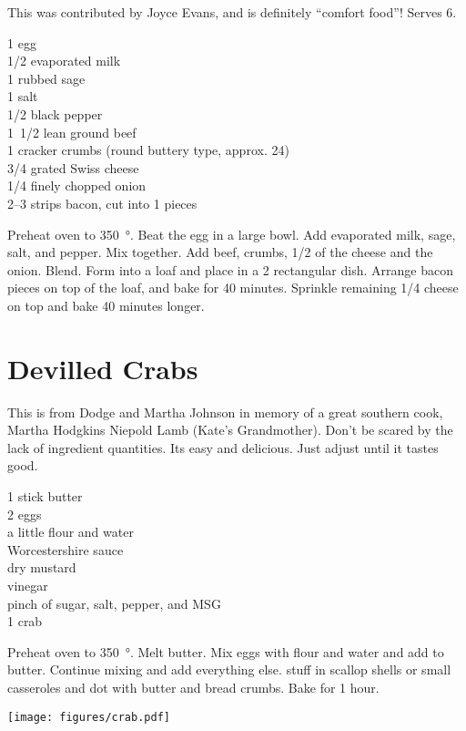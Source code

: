 \begin{open}
  This was contributed by Joyce Evans, and is definitely ``comfort
  food''! Serves 6.
\end{open}
\begin{ingredients}
  1 egg \\
  \SI{1/2}{\cup} evaporated milk \\
  \SI{1}{\teaspoon} rubbed sage \\
  \SI{1}{\teaspoon} salt \\
  \SI{1/2}{\teaspoon} black pepper \\
  \SI{1/2}[1]{\pound} lean ground beef \\
  \SI{1}{\cup} cracker crumbs (round buttery type, approx. 24) \\
  \SI{3/4}{\cup} grated Swiss cheese \\
  \SI{1/4}{\cup} finely chopped onion \\
  \numrange{2}{3} strips bacon, cut into \SI{1}{\inch} pieces
\end{ingredients}
Preheat oven to \SI{350}{\degree}. Beat the egg in a large bowl. Add evaporated milk,
sage, salt, and pepper.  Mix together. Add beef, crumbs, \SI{1/2}{\cup} of the
cheese and the onion. Blend. Form into a loaf and place in a \SI{2}{\quart}
rectangular dish.  Arrange bacon pieces on top of the loaf, and bake for
40 minutes. Sprinkle remaining \SI{1/4}{\cup} cheese on top and bake
40 minutes longer.

\section{Devilled Crabs}

\begin{open}
  This is from Dodge and Martha Johnson in memory of a great southern
  cook, Martha Hodgkins Niepold Lamb (Kate's Grandmother).  Don't be scared by
  the lack of ingredient quantities. Its easy and delicious.  Just adjust
  until it tastes good.
\end{open}
\begin{ingredients}
  1 stick butter\\
  2 eggs\\
  a little flour and water\\
  Worcestershire sauce\\
  dry mustard\\
  vinegar\\
  pinch of sugar, salt, pepper, and MSG\\
  \SI{1}{\pound} crab
\end{ingredients}
Preheat oven to \SI{350}{\degree}.  Melt butter. Mix eggs with flour and water and add
to butter. Continue mixing and add everything else. stuff in scallop shells or
small casseroles and dot with butter and bread crumbs. Bake for 1 hour.
\begin{center}
    \texttt{[image: figures/crab.pdf]}
\end{center}

